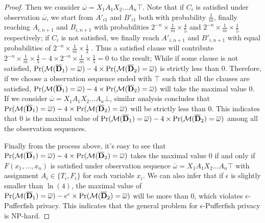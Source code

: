 \begin{proof}
  Then we consider $\overline{\omega}=X_1A_1X_2\ldots A_n \top$. Note that if $C_i$ is satisfied under observation $\overline{\omega}$, we start from $A'_{i1}$ and $B'_{i1}$ both with
  probability $\frac{1}{m}$, finally reaching $A_{i,n+1}$ and $B_{i,n+1}$ with probabilities $2^{-n} \times \frac{1}{m} \times \frac{4}{5}$
  and $2^{-n} \times \frac{1}{m} \times \frac{1}{5}$ respectively;
  if $C_i$ is not satisfied, we finally reach $A'_{i,n+1}$ and $B'_{i,n+1}$  with equal probabilities of $2^{-n}\times \frac{1}{m} \times \frac{1}{2}$ .
  Thus a satisfied clause will contribute $2^{-n} \times \frac{1}{m} \times \frac{4}{5} - 4 \times 2^{-n} \times \frac{1}{m} \times \frac{1}{5} = 0$ to
  the result; While if some clause is not satisfied, $\Pr (\mathcal{M} (\overline{\mathbf{D}}_1) = \overline{\omega})- 4\times \Pr (\mathcal{M} (\overline{\mathbf{D}}_2) = \overline{\omega})$ is strictly less than $0$.
  Therefore, if we choose a observation sequence ended with $\top$ such that all the
  clauses are satisfied, $\Pr (\mathcal{M} (\overline{\mathbf{D}}_1) = \overline{\omega})- 4\times \Pr (\mathcal{M} (\overline{\mathbf{D}}_2) = \overline{\omega})$ will take the maximal value 0.
  If we consider $\overline{\omega}=X_1A_1X_2\ldots A_n \bot$, similar analysis concludes that $\Pr (\mathcal{M} (\overline{\mathbf{D}}_1) = \overline{\omega}) - 4 \times \Pr (\mathcal{M} (\overline{\mathbf{D}}_2) = \overline{\omega})$
  will be strictly less than $0$.
  This indicates that $0$ is the maximal value of $\Pr (\mathcal{M} (\overline{\mathbf{D}}_1) = \overline{\omega}) - 4 \times \Pr (\mathcal{M} (\overline{\mathbf{D}}_2) = \overline{\omega})$
  among all the observation sequences.

  Finally from the process above, it's easy to see that
  $\Pr (\mathcal{M} (\overline{\mathbf{D}}_1) = \overline{\omega}) - 4 \times \Pr (\mathcal{M} (\overline{\mathbf{D}}_2) = \overline{\omega})$ takes the maximal value $0$
  if and only if $F(x_1,\ldots,x_n)$ is satisfied under observation sequence $\overline{\omega}=X_1A_1X_2\ldots A_n \top$ 
  with assignment $A_i \in \{T_i,F_i\}$ for each variable $x_i$.
  We can also infer that if $\epsilon$ is slightly smaller than $\ln(4)$, the maximal value of
  $\Pr (\mathcal{M} (\overline{\mathbf{D}}_1) = \overline{\omega}) - e ^\epsilon \times \Pr (\mathcal{M} (\overline{\mathbf{D}}_2) = \overline{\omega})$ will be more than $0$,
  which violates $\epsilon$-Pufferfish privacy.
  This indicates that the general problem for $\epsilon$-Pufferfish privacy is NP-hard.

\end{proof} 